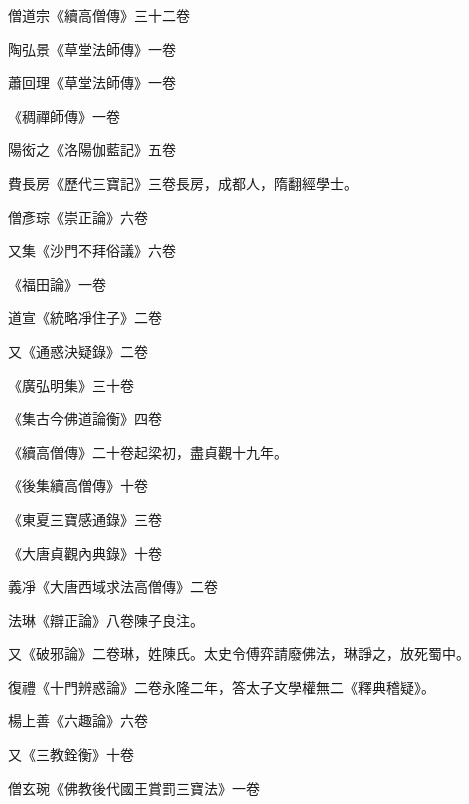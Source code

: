 \begin{pinyinscope}
 僧道宗《續高僧傳》三十二卷



 陶弘景《草堂法師傳》一卷



 蕭回理《草堂法師傳》一卷



 《稠禪師傳》一卷



 陽衒之《洛陽伽藍記》五卷



 費長房《歷代三寶記》三卷長房，成都人，隋翻經學士。



 僧彥琮《崇正論》六卷



 又集《沙門不拜俗議》六卷



 《福田論》一卷



 道宣《統略凈住子》二卷



 又《通惑決疑錄》二卷



 《廣弘明集》三十卷



 《集古今佛道論衡》四卷



 《續高僧傳》二十卷起梁初，盡貞觀十九年。



 《後集續高僧傳》十卷



 《東夏三寶感通錄》三卷



 《大唐貞觀內典錄》十卷



 義凈《大唐西域求法高僧傳》二卷



 法琳《辯正論》八卷陳子良注。



 又《破邪論》二卷琳，姓陳氏。太史令傅弈請廢佛法，琳諍之，放死蜀中。



 復禮《十門辨惑論》二卷永隆二年，答太子文學權無二《釋典稽疑》。



 楊上善《六趣論》六卷



 又《三教銓衡》十卷



 僧玄琬《佛教後代國王賞罰三寶法》一卷




\end{pinyinscope}
